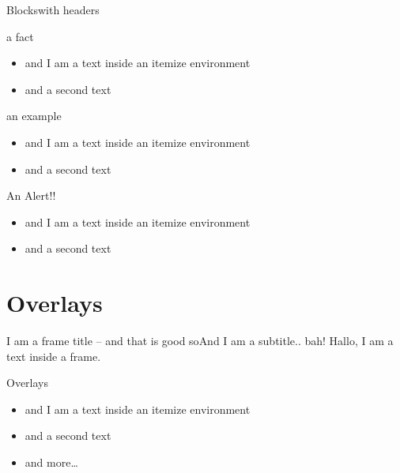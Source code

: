 \documentclass[]{beamer}
\begin{document}
\begin{frame}{Blocks}{with headers}
\begin{block}{a fact}
\begin{itemize}
\item and I am a text inside an itemize environment
\item and a second text
\end{itemize}
\end{block}

\vfill

\begin{exampleblock}{an example}
\begin{itemize}
\item and I am a text inside an itemize environment
\item and a second text
\end{itemize}
\end{exampleblock}

\vfill

\begin{alertblock}{An Alert!!}
\begin{itemize}
\item and I am a text inside an itemize environment
\item and a second text
\end{itemize}
\end{alertblock}
\end{frame}


%
%
\section{Overlays}

\begin{frame}{\secname{}}
\end{frame}

\begin{frame}{I am a frame title -- and that is good so}{And I am a subtitle.. bah!}
Hallo, I am a text inside a frame.

\vfill

\begin{block}{Overlays}
\begin{itemize}
\item<+-> and I am a text inside an itemize environment
\item<+-> and a second text
\item<+-> and more\ldots
\end{itemize}
\end{block}
\end{frame}
\end{document}

